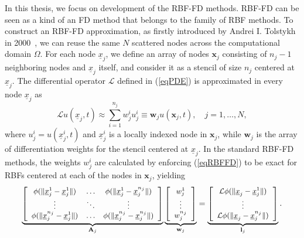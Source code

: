 \documentclass{UUThesisTemplate}
\begin{document}
\par
In this thesis, we focus on development of the RBF-FD methods. RBF-FD can be seen as a kind of an FD method that belongs to the family of RBF methods. To construct an RBF-FD approximation, as firstly introduced by Andrei I. Tolstykh in 2000~\cite{tolstykh2000using}, we can reuse the same $N$ scattered nodes across the computational domain $\Omega$. For each node $\underline{x}_j$, we define an array of nodes $\mathbf{x}_j$ consisting of $n_j-1$ neighboring nodes and $\underline{x}_j$ itself, and consider it as a stencil of size $n_j$ centered at $\underline{x}_j$. The differential operator $\mathcal{L}$ defined in (\ref{eqPDE})  is approximated in every node  $\underline{x}_j$ as
\begin{equation}
\mathcal{L}u(\underline{x}_j, t)\approx\sum_{i=1}^{n_j}{w}_{j}^{i}u_j^{i}\equiv \mathbf{w}_j u(\mathbf{x}_j, t),\quad j=1,\ldots,N,
\label{eqRBFFD}
\end{equation}
where $u_j^{i}=u(\underline{x}_j^i,t)$ and $\underline{x}_j^i$ is a locally indexed node in $\mathbf{x}_j$, while $\mathbf{w}_j$ is the array of differentiation weights for the stencil centered at $\underline{x}_j$. In the standard RBF-FD methods, the weights ${w}_j^i$ are calculated by enforcing (\ref{eqRBFFD}) to be exact for RBFs centered at each of the nodes in $\mathbf{x}_j$, yielding
\begin{equation}
\label{eqRBFFDmat}
{\footnotesize{
\underbrace{\left[\begin{array}{cccc}
\phi(\|\underline{x}_j^{1}-\underline{x}_j^{1}\|) & \ldots & \phi(\|\underline{x}_j^{1}-\underline{x}_{j}^{n_j}\|)\\
\vdots & \ddots & \vdots\\
\phi(\|\underline{x}_{j}^{n_j}-\underline{x}_j^{1}\|) & \ldots & \phi(\|\underline{x}_{j}^{n_j}-\underline{x}_{j}^{n_j}\|)
\end{array}\right]}_{\mathbf{A}_j} \underbrace{\left[\begin{array}{c}
{w}_j^{1}\\
\vdots\\
{w}_{j}^{n_j}
\end{array}\right]}_{\mathbf{w}_j}=
\underbrace{\left[\begin{array}{c}
\mathcal{L}\phi(\|\underline{x}_{j}-\underline{x}_j^{1}\|)\\
\vdots \\
\mathcal{L}\phi(\|\underline{x}_{j}-\underline{x}_{{j}}^{n_j}\|)
\end{array}\right]}_{\mathbf{l}_j}.}}
\end{equation}
\end{document}
